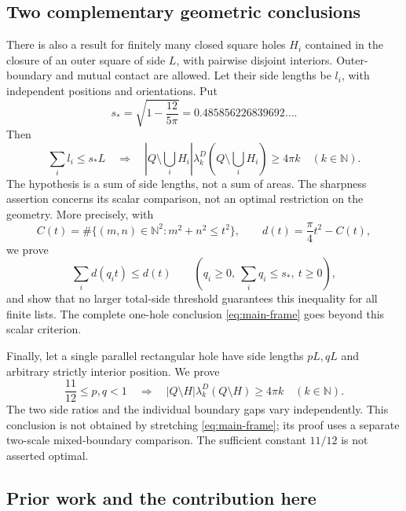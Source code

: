 \documentclass[11pt,reqno]{amsart}
\numberwithin{equation}{section}
\newcommand{\N}{\mathbb N}
\begin{document}
\subsection*{Two complementary geometric conclusions}

There is also a result for finitely many closed square holes $H_i$
contained in the closure of an outer square of side $L$, with
pairwise disjoint interiors. Outer-boundary and mutual contact are
allowed.
Let their side lengths be $l_i$, with independent positions and
orientations. Put
\begin{equation}\label{eq:sharp-constant}
 s_*=\sqrt{1-\frac{12}{5\pi}}
      =0.485856226839692\ldots.
\end{equation}
Then
\begin{equation}\label{eq:main-holes}
 \sum_i l_i\le s_*L
 \quad\Longrightarrow\quad
 \left|Q\setminus\bigcup_iH_i\right|
 \lambda_k^D\!\left(Q\setminus\bigcup_iH_i\right)\ge4\pi k
 \quad(k\in\N).
\end{equation}
The hypothesis is a sum of side lengths, not a sum of areas.
The sharpness assertion concerns its scalar comparison, not an
optimal restriction on the geometry. More precisely, with
\begin{equation}\label{eq:count-intro}
 C(t)=\#\{(m,n)\in\N^2:m^2+n^2\le t^2\},\qquad
 d(t)=\frac\pi4t^2-C(t),
\end{equation}
we prove
\begin{equation}\label{eq:scalar-main}
 \sum_i d(q_it)\le d(t)
 \qquad\left(q_i\ge0,\ \sum_iq_i\le s_*,\ t\ge0\right),
\end{equation}
and show that no larger total-side threshold guarantees this
inequality for all finite lists. The complete one-hole conclusion
\eqref{eq:main-frame} goes beyond this scalar criterion.

Finally, let a single parallel rectangular hole have side lengths
$pL,qL$ and arbitrary strictly interior position. We prove
\begin{equation}\label{eq:main-displaced}
 \frac{11}{12}\le p,q<1
 \quad\Longrightarrow\quad
 |Q\setminus H|\lambda_k^D(Q\setminus H)\ge4\pi k
 \quad(k\in\N).
\end{equation}
The two side ratios and the individual boundary gaps vary
independently. This conclusion is not obtained by stretching
\eqref{eq:main-frame}; its proof uses a separate two-scale
mixed-boundary comparison. The sufficient constant $11/12$ is not
asserted optimal.

\subsection*{Prior work and the contribution here}
\end{document}
